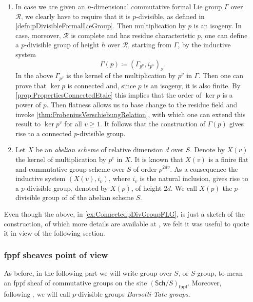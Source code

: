 \begin{ex}
\begin{enumerate}
\item In case we are given an $n$-dimensional commutative\label{ex:ConnectedpDivGroupFLG}
	formal Lie group $\Gamma$ over $\mathscr{R}$, we clearly have to require that it is $p$-divisible,
	as defined in \cref{defn:pDivisibleFormalLieGroup}.
	Then multiplication by $p$ is an isogeny.
	In case, moreover, $\mathscr{R}$ is complete and has residue characteristic $p$,
	one can define a $p$-divisible group of height $h$
	over $\mathscr{R}$, starting from $\Gamma$, by the inductive system
	\begin{equation*}
		\Gamma(p) \coloneqq \left(\Gamma_{p^\nu}, i_{p^\nu}\right)_\nu
	.\end{equation*} 
	In the above $\Gamma_{p^\nu}$ is the kernel of
	the multiplication by $p^\nu$ in $\Gamma$.
	Then one can prove that $\ker p$ is connected and,
	since $p$ is an isogeny, it is also finite.
	By \cref{prop:PropertiesConnectedEtale} this implies that
	the order of $\ker p$ is a power of $p$.
	Then flatness allows us to base change to the residue field and invoke
	\cref{thm:FrobeniusVerschiebungRelation}, with which one can extend 
	this result to $\ker p^v$ for all $v \geq 1$.
	It follows that the construction of $\Gamma(p)$
	gives rise to a connected $p$-divisible group.

\item Let \(X\) be an \emph{abelian scheme} of relative dimension \(d\)
	over \(S\).
	Denote by \(X(v)\) the kernel of multiplication by \(p^v\)
	in \(X\).
	It is known that \(X(v)\) is a finire flat and commutative
	group scheme over \(S\) of order \(p^{ 2dv }\).
	As a consequence the inductive system \(\left(X(v), i_v\right)\),
	where \(i_v\) is the natural inclusion, gives rise to
	a \(p\)-divisible group, denoted by \(X(p)\),
	of height \(2d\).
	We call \(X(p)\) the \(p\)-divisible group of
	of the abelian scheme \(S\).
\end{enumerate}
\end{ex}


\begin{rem}[]
	Even though the above, in \cref{ex:ConnectedpDivGroupFLG},
	is just a sketch of the construction, of which more details
	are available at \cite[\S6]{Shatz},
	we felt it was useful to quote it in view of the following section.
\end{rem}



\subsubsection{fppf sheaves point of view}
As before, in the following part we will write group over $S$, or $S$-group, to mean
an fppf sheaf of commutative groups on the site $(\mathsf{Sch}/S)_{\mathrm{fppf}}$.
Moreover, following \cite{Messing}, we will call $p$-divisible groups
\emph{Barsotti-Tate groups}.


